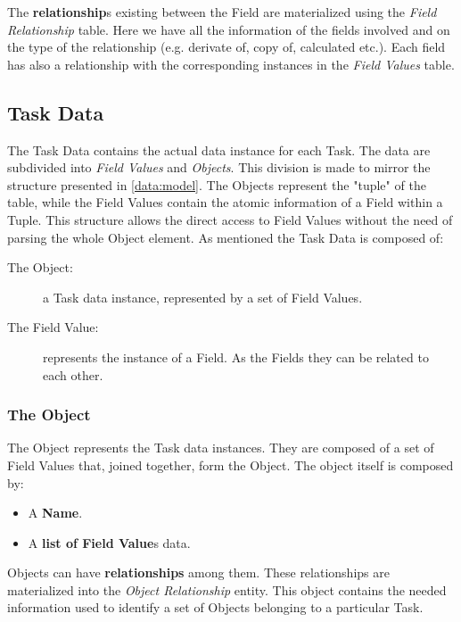 The \textbf{relationship}s existing between the Field are materialized using the
\emph{Field Relationship} table. Here we have all the information of the fields
involved and on the type of the relationship (e.g. derivate of, copy of, calculated
etc.). Each field has also a relationship with the corresponding instances
in the \emph{Field Values} table.








\subsection{Task Data}
The Task Data contains the actual data instance for each Task. The data
are subdivided into \emph{Field Values} and \emph{Objects}. This division is made
to mirror the structure presented in \ref{data:model}. The Objects represent
the "tuple" of the table, while the Field Values contain the atomic information
of a Field within a Tuple. This structure allows the direct access to Field
Values without the need of parsing the whole Object element. As mentioned the
Task Data is composed of:
\begin{description}
    \item[The Object:] a Task data instance, represented by a set of Field Values.
    \item[The Field Value:] represents the instance of a Field. As the Fields
    they can be related to each other.
\end{description}


\subsubsection{The Object}
The Object represents the Task data instances. They are composed of a set of
Field Values that, joined together, form the Object. The object itself is
composed by:
\begin{itemize}
    \item A \textbf{Name}.
    \item A \textbf{list of Field Value}s data.
\end{itemize}

Objects can have \textbf{relationships} among them. These relationships are
materialized into the \emph{Object Relationship} entity. This object contains
the needed information used to identify a set of Objects belonging to a
particular Task.



